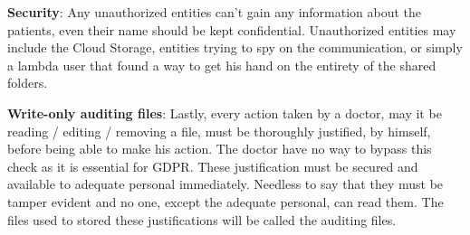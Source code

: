 \documentclass[../main.tex]{subfiles}
\begin{document}
\par \textbf{Security}: Any unauthorized entities can't gain any information about the patients, even their name should be kept confidential. Unauthorized entities may include the Cloud Storage, entities trying to spy on the communication, or simply a lambda user that found a way to get his hand on the entirety of the shared folders.
\par \textbf{Write-only auditing files}: Lastly, every action taken by a doctor, may it be reading / editing / removing a file, must be thoroughly justified, by himself, before being able to make his action. The doctor have no way to bypass this check as it is essential for GDPR. These justification must be secured and available to adequate personal immediately. Needless to say that they must be tamper evident and no one, except the adequate personal, can read them. The files used to stored these justifications will be called the auditing files.
\end{document}
